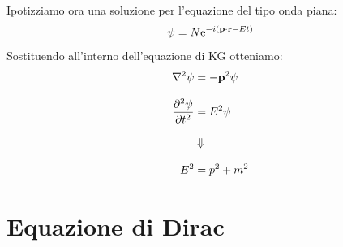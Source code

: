 Ipotizziamo ora una soluzione per l'equazione del tipo onda piana:
\begin{equation}
    \psi = N\mathrm{e}^{-i\left(\vb{p}\cdot\vb{r} - Et\right)}
\end{equation}
Sostituendo all'interno dell'equazione di KG otteniamo:
\begin{equation}
    \begin{split}
        \lap \psi &= -\vec{p}^2\psi \\[8pt]
        \pdv[2]{\psi}{t}  &= E^2\psi \\[8pt]
        &\Downarrow \\[8pt]
        E^2 &= p^2 + m^2
    \end{split}
\end{equation}
\section{Equazione di Dirac}


